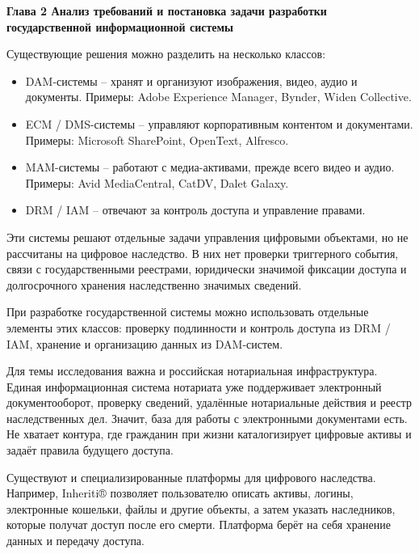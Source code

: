 \newpage
\begin{center}
  \textbf{\large Глава 2 Анализ требований и постановка задачи разработки государственной информационной системы}
\end{center}
\setcounter{section}{0}


Существующие решения можно разделить на несколько классов:

\begin{itemize}
  \item DAM-системы -- хранят и организуют изображения, видео, аудио и документы. Примеры: Adobe Experience Manager, Bynder, Widen Collective.
  \item ECM / DMS-системы -- управляют корпоративным контентом и документами. Примеры: Microsoft SharePoint, OpenText, Alfresco.
  \item MAM-системы -- работают с медиа-активами, прежде всего видео и аудио. Примеры: Avid MediaCentral, CatDV, Dalet Galaxy.
  \item DRM / IAM -- отвечают за контроль доступа и управление правами.
\end{itemize}

Эти системы решают отдельные задачи управления цифровыми объектами, но не рассчитаны на цифровое наследство. В них нет проверки триггерного события, связи с государственными реестрами, юридически значимой фиксации доступа и долгосрочного хранения наследственно значимых сведений.

При разработке государственной системы можно использовать отдельные элементы этих классов: проверку подлинности и контроль доступа из DRM / IAM, хранение и организацию данных из DAM-систем.

Для темы исследования важна и российская нотариальная инфраструктура. Единая информационная система нотариата уже поддерживает электронный документооборот, проверку сведений, удалённые нотариальные действия и реестр наследственных дел. Значит, база для работы с электронными документами есть. Не хватает контура, где гражданин при жизни каталогизирует цифровые активы и задаёт правила будущего доступа.

Существуют и специализированные платформы для цифрового наследства. Например, Inheriti® позволяет пользователю описать активы, логины, электронные кошельки, файлы и другие объекты, а затем указать наследников, которые получат доступ после его смерти. Платформа берёт на себя хранение данных и передачу доступа.

